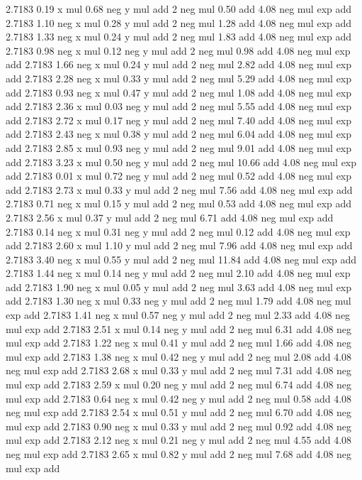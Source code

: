 2.7183 0.19 x mul 0.68 neg y mul add 2 neg mul 0.50 add 4.08 neg mul exp add %
2.7183 1.10 neg x mul 0.28 y mul add 2 neg mul 1.28 add 4.08 neg mul exp add %
2.7183 1.33 neg x mul 0.24 y mul add 2 neg mul 1.83 add 4.08 neg mul exp add %
2.7183 0.98 neg x mul 0.12 neg y mul add 2 neg mul 0.98 add 4.08 neg mul exp add %
2.7183 1.66 neg x mul 0.24 y mul add 2 neg mul 2.82 add 4.08 neg mul exp add %
2.7183 2.28 neg x mul 0.33 y mul add 2 neg mul 5.29 add 4.08 neg mul exp add %
2.7183 0.93 neg x mul 0.47 y mul add 2 neg mul 1.08 add 4.08 neg mul exp add %
2.7183 2.36 x mul 0.03 neg y mul add 2 neg mul 5.55 add 4.08 neg mul exp add %
2.7183 2.72 x mul 0.17 neg y mul add 2 neg mul 7.40 add 4.08 neg mul exp add %
2.7183 2.43 neg x mul 0.38 y mul add 2 neg mul 6.04 add 4.08 neg mul exp add %
2.7183 2.85 x mul 0.93 neg y mul add 2 neg mul 9.01 add 4.08 neg mul exp add %
2.7183 3.23 x mul 0.50 neg y mul add 2 neg mul 10.66 add 4.08 neg mul exp add %
2.7183 0.01 x mul 0.72 neg y mul add 2 neg mul 0.52 add 4.08 neg mul exp add %
2.7183 2.73 x mul 0.33 y mul add 2 neg mul 7.56 add 4.08 neg mul exp add %
2.7183 0.71 neg x mul 0.15 y mul add 2 neg mul 0.53 add 4.08 neg mul exp add %
2.7183 2.56 x mul 0.37 y mul add 2 neg mul 6.71 add 4.08 neg mul exp add %
2.7183 0.14 neg x mul 0.31 neg y mul add 2 neg mul 0.12 add 4.08 neg mul exp add %
2.7183 2.60 x mul 1.10 y mul add 2 neg mul 7.96 add 4.08 neg mul exp add %
2.7183 3.40 neg x mul 0.55 y mul add 2 neg mul 11.84 add 4.08 neg mul exp add %
2.7183 1.44 neg x mul 0.14 neg y mul add 2 neg mul 2.10 add 4.08 neg mul exp add %
2.7183 1.90 neg x mul 0.05 y mul add 2 neg mul 3.63 add 4.08 neg mul exp add %
2.7183 1.30 neg x mul 0.33 neg y mul add 2 neg mul 1.79 add 4.08 neg mul exp add %
2.7183 1.41 neg x mul 0.57 neg y mul add 2 neg mul 2.33 add 4.08 neg mul exp add %
2.7183 2.51 x mul 0.14 neg y mul add 2 neg mul 6.31 add 4.08 neg mul exp add %
2.7183 1.22 neg x mul 0.41 y mul add 2 neg mul 1.66 add 4.08 neg mul exp add %
2.7183 1.38 neg x mul 0.42 neg y mul add 2 neg mul 2.08 add 4.08 neg mul exp add %
2.7183 2.68 x mul 0.33 y mul add 2 neg mul 7.31 add 4.08 neg mul exp add %
2.7183 2.59 x mul 0.20 neg y mul add 2 neg mul 6.74 add 4.08 neg mul exp add %
2.7183 0.64 neg x mul 0.42 neg y mul add 2 neg mul 0.58 add 4.08 neg mul exp add %
2.7183 2.54 x mul 0.51 y mul add 2 neg mul 6.70 add 4.08 neg mul exp add %
2.7183 0.90 neg x mul 0.33 y mul add 2 neg mul 0.92 add 4.08 neg mul exp add %
2.7183 2.12 neg x mul 0.21 neg y mul add 2 neg mul 4.55 add 4.08 neg mul exp add %
2.7183 2.65 x mul 0.82 y mul add 2 neg mul 7.68 add 4.08 neg mul exp add %
